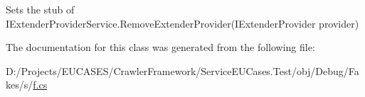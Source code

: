 Sets the stub of I\-Extender\-Provider\-Service.\-Remove\-Extender\-Provider(\-I\-Extender\-Provider provider)



The documentation for this class was generated from the following file\-:\begin{DoxyCompactItemize}
\item 
D\-:/\-Projects/\-E\-U\-C\-A\-S\-E\-S/\-Crawler\-Framework/\-Service\-E\-U\-Cases.\-Test/obj/\-Debug/\-Fakes/s/\hyperlink{s_2f_8cs}{f.\-cs}\end{DoxyCompactItemize}
